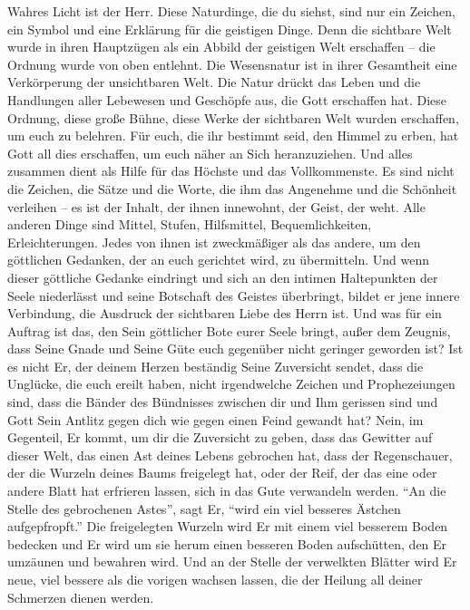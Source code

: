 Wahres Licht ist der Herr. Diese Naturdinge, die du siehst, sind nur ein Zeichen, ein Symbol und eine Erklärung für die geistigen Dinge. Denn die sichtbare Welt wurde in ihren Hauptzügen als ein Abbild der geistigen Welt erschaffen -- die Ordnung wurde von oben entlehnt. Die Wesensnatur ist in ihrer Gesamtheit eine Verkörperung der unsichtbaren Welt. Die Natur drückt das Leben und die Handlungen aller Lebewesen und Geschöpfe aus, die Gott erschaffen hat. Diese Ordnung, diese große Bühne, diese Werke der sichtbaren Welt wurden erschaffen, um euch zu belehren. Für euch, die ihr bestimmt seid, den Himmel zu erben, hat Gott all dies erschaffen, um euch näher an Sich heranzuziehen. Und alles zusammen dient als Hilfe für das Höchste und das Vollkommenste. Es sind nicht die Zeichen, die Sätze und die Worte, die ihm das Angenehme und die Schönheit verleihen -- es ist der Inhalt, der ihnen innewohnt, der Geist, der weht. Alle anderen Dinge sind Mittel, Stufen, Hilfsmittel, Bequemlichkeiten, Erleichterungen. Jedes von ihnen ist zweckmäßiger als das andere, um den göttlichen Gedanken, der an euch gerichtet wird, zu übermitteln. Und wenn dieser göttliche Gedanke eindringt und sich an den intimen Haltepunkten der Seele niederlässt und seine Botschaft des Geistes überbringt, bildet er jene innere Verbindung, die Ausdruck der sichtbaren Liebe des Herrn ist. Und was für ein Auftrag ist das, den Sein göttlicher Bote eurer Seele bringt, außer dem Zeugnis, dass Seine Gnade und Seine Güte euch gegenüber nicht geringer geworden ist? Ist es nicht Er, der deinem Herzen beständig Seine Zuversicht sendet, dass die Unglücke, die euch ereilt haben, nicht irgendwelche Zeichen und Prophezeiungen sind, dass die Bänder des Bündnisses zwischen dir und Ihm gerissen sind und Gott Sein Antlitz gegen dich wie gegen einen Feind gewandt hat? Nein, im Gegenteil, Er kommt, um dir die Zuversicht zu geben, dass das Gewitter auf dieser Welt, das einen Ast deines Lebens gebrochen hat, dass der Regenschauer, der die Wurzeln deines Baums freigelegt hat, oder der Reif, der das eine oder andere Blatt hat erfrieren lassen, sich in das Gute verwandeln werden. "`An die Stelle des gebrochenen Astes"', sagt Er, "`wird ein viel besseres Ästchen aufgepfropft."' Die freigelegten Wurzeln wird Er mit einem viel besserem Boden bedecken und Er wird um sie herum einen besseren Boden aufschütten, den Er umzäunen und bewahren wird. Und an der Stelle der verwelkten Blätter wird Er neue, viel bessere als die vorigen wachsen lassen, die der Heilung all deiner Schmerzen dienen werden. 

